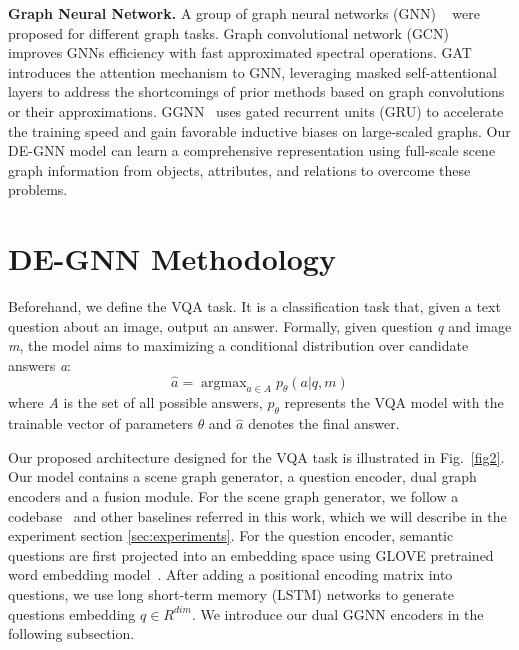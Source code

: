 \documentclass[letterpaper]{article} %
\begin{document}
\vspace{0.05in}
\noindent\textbf{Graph Neural Network.}
A group of graph neural networks (GNN) ~\cite{DBLP:journals/tnn/ScarselliGTHM09,DBLP:conf/cncl/WangGCL16,DBLP:conf/aaai/WangCGL18,DBLP:conf/aistats/SunL19,DBLP:conf/aaai/0001RFHLRG19,DBLP:conf/aaai/LiuCLZLSQ19} were proposed for different graph tasks.
Graph convolutional network (GCN)~\cite{DBLP:conf/iclr/KipfW17} improves GNNs efficiency with fast approximated spectral operations. 
GAT~\cite{DBLP:conf/iclr/VelickovicCCRLB18} introduces the attention mechanism to GNN, leveraging masked self-attentional layers to address the shortcomings of prior methods based on graph convolutions or their approximations. GGNN~\cite{DBLP:journals/corr/LiTBZ15} uses gated recurrent units (GRU) to accelerate the training speed and gain favorable inductive biases on large-scaled graphs.
Our DE-GNN model can learn a comprehensive representation using full-scale scene graph information from objects, attributes, and relations to overcome these problems.

\section{DE-GNN Methodology}

Beforehand, we define the VQA task. 
It is a classification task that, given a text question about an image, output an answer. 
Formally, given question \emph{q} and image \emph{m}, the model aims to maximizing a conditional distribution over candidate answers \emph{a}:
\begin{equation}
    \hat{a} = \mathop{\arg\max}_{a \in A}p_\theta(a|q, m)
\end{equation}
where \emph{A} is the set of all possible answers, $p_\theta$ represents the VQA model with the trainable vector of parameters $\theta$ and $\hat{a}$ denotes the final answer.

Our proposed architecture designed for the VQA task is illustrated in Fig.~\ref{fig2}. 
Our model contains a scene graph generator, a question encoder, dual graph encoders and a fusion module. For the scene graph generator, we follow a codebase~\cite{tang2020sggcode} and other baselines referred in this work, which we will describe in the experiment section \ref{sec:experiments}. 
For the question encoder, semantic questions are first projected into an embedding space using GLOVE pretrained word embedding model~\cite{pennington-etal-2014-glove}. 
After adding a positional encoding matrix into questions, we use long short-term memory (LSTM) networks to generate questions embedding $q \in R^{dim}$. 
We introduce our dual GGNN encoders in the following subsection.
\end{document}
